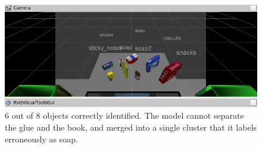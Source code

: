 \documentclass[a4paper,12pt]{report}
\begin{document}
\begin{figure}[H]
\centering
        \includegraphics[totalheight=6cm]{imgs/result3.png}
        \caption{6 out of 8 objects correctly identified. The model cannot separate the glue and the book, and merged into a single cluster that it labels erroneously as soap.}
\end{figure}
\end{document}

